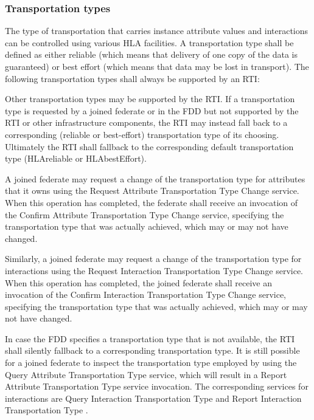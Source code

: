 \clearpage

\begin{compactstdpage}

    \subsubsection{Transportation types}


    The type of transportation that carries instance attribute values and interactions can be controlled using various HLA facilities. A transportation type shall be defined as either reliable (which means that delivery of one copy of the data is guaranteed) or best effort (which means that data may be lost in transport). The following transportation types shall always be supported by an RTI:




    Other transportation types may be supported by the RTI. If a transportation type is requested by a joined federate or in the FDD but not supported by the RTI or other infrastructure components, the RTI may instead fall back to a corresponding (reliable or best-effort) transportation type of its choosing. Ultimately the RTI shall fallback to the corresponding default transportation type (HLAreliable or HLAbestEffort).


    A joined federate may request a change of the transportation type for attributes that it owns using the Request Attribute Transportation Type Change service. When this operation has completed, the federate shall receive an invocation of the Confirm Attribute Transportation Type Change \rtiinitiated{} service, specifying the transportation type that was actually achieved, which may or may not have changed.


    Similarly, a joined federate may request a change of the transportation type for interactions using the Request Interaction Transportation Type Change service. When this operation has completed, the joined federate shall receive an invocation of the Confirm Interaction Transportation Type Change \rtiinitiated{} service, specifying the transportation type that was actually achieved, which may or may not have changed.


    In case the FDD specifies a transportation type that is not available, the RTI shall silently fallback to a corresponding transportation type. It is still possible for a joined federate to inspect the transportation type employed by using the Query Attribute Transportation Type service, which will result in a Report Attribute Transportation Type \rtiinitiated{} service invocation. The corresponding services for interactions are Query Interaction Transportation Type and Report Interaction Transportation Type \rtiinitiated{}.


\end{compactstdpage}
